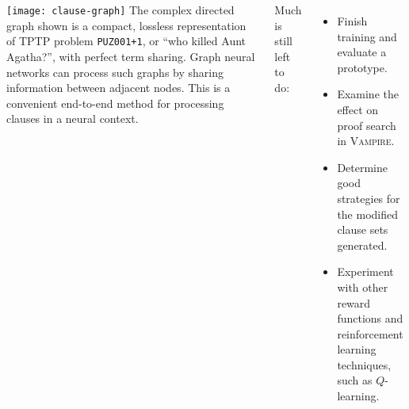 \documentclass[24pt, a1paper, portrait]{tikzposter}
\newcommand{\vampire}{\textsc{Vampire}}
\begin{document}
\begin{columns}
{
	{
	\centering
	\texttt{[image: clause-graph]}
	}
	The complex directed graph shown is a compact, lossless representation of TPTP problem \texttt{PUZ001+1}, or ``who killed Aunt Agatha?'', with perfect term sharing.
	Graph neural networks can process such graphs by sharing information between adjacent nodes.
	This is a convenient end-to-end method for processing clauses in a neural context.
}

{
	Much is still left to do:
	\begin{itemize}[leftmargin=1in]
		\item Finish training and evaluate a prototype.
		\item Examine the effect on proof search in \vampire{}.
		\item Determine good strategies for the modified clause sets generated.
		\item Experiment with other reward functions and reinforcement learning techniques, such as \(Q\)-learning.
	\end{itemize}
}
\end{columns}
\end{document}
